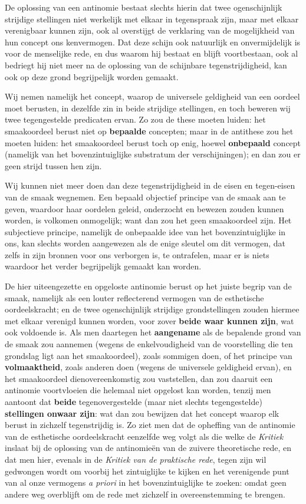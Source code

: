 De oplossing van een antinomie bestaat slechts hierin dat twee ogenschijnlijk strijdige stellingen niet werkelijk met elkaar in tegenspraak zijn, maar met elkaar verenigbaar kunnen zijn, ook al overstijgt de verklaring van de mogelijkheid van hun concept ons kenvermogen. Dat deze schijn ook natuurlijk en onvermijdelijk is voor de menselijke rede, en dus waarom hij bestaat en blijft voortbestaan, ook al bedriegt hij niet meer na de oplossing van de schijnbare tegenstrijdigheid, kan ook op deze grond begrijpelijk worden gemaakt.

Wij nemen namelijk het concept, waarop de universele geldigheid van een oordeel moet berusten, in dezelfde zin in beide strijdige stellingen, en toch beweren wij twee tegengestelde predicaten ervan. Zo zou de these moeten luiden: het smaakoordeel berust niet op \textbf{bepaalde} concepten; maar in de antithese zou het moeten luiden: het smaakoordeel berust toch op enig, hoewel \textbf{onbepaald} concept (namelijk van het bovenzintuiglijke substratum der verschijningen); en dan zou er geen strijd tussen hen zijn.

Wij kunnen niet meer doen dan deze tegenstrijdigheid in de eisen en tegen-eisen van de smaak wegnemen. Een bepaald objectief principe van de smaak aan te geven, waardoor haar oordelen geleid, onderzocht en bewezen zouden kunnen worden, is volkomen onmogelijk; want dan zou het geen smaakoordeel zijn. Het subjectieve principe, namelijk de onbepaalde idee van het bovenzintuiglijke in ons, kan slechts worden aangewezen als de enige sleutel om dit vermogen, dat zelfs in zijn bronnen voor ons verborgen is, te ontrafelen, maar er is niets waardoor het verder begrijpelijk gemaakt kan worden.

De hier uiteengezette en opgeloste antinomie berust op het juiste begrip van de smaak, namelijk als een louter reflecterend vermogen van de esthetische oordeelskracht; en de twee ogenschijnlijk strijdige grondstellingen zouden hiermee met elkaar verenigd kunnen worden, voor zover \textbf{beide waar kunnen zijn}, wat ook voldoende is. Als men daartegen het \textbf{aangename} als de bepalende grond van de smaak zou aannemen (wegens de enkelvoudigheid van de voorstelling die ten grondslag ligt aan het smaakoordeel), zoals sommigen doen, of het principe van \textbf{volmaaktheid}, zoals anderen doen (wegens de universele geldigheid ervan), en het smaakoordeel dienovereenkomstig zou vaststellen, dan zou daaruit een antinomie voortvloeien die helemaal niet opgelost kan worden, tenzij men aantoont dat \textbf{beide} tegenovergestelde (maar niet slechts tegengestelde) \textbf{stellingen onwaar zijn}: wat dan zou bewijzen dat het concept waarop elk berust in zichzelf tegenstrijdig is. Zo ziet men dat de opheffing van de antinomie van de esthetische oordeelskracht eenzelfde weg volgt als die welke de \textit{Kritiek} inslaat bij de oplossing van de antinomieën van de zuivere theoretische rede, en dat men hier, evenals in de \textit{Kritiek van de praktische rede}, tegen zijn wil gedwongen wordt om voorbij het zintuiglijke te kijken en het verenigende punt van al onze vermogens \textit{a priori} in het bovenzintuiglijke te zoeken: omdat geen andere weg overblijft om de rede met zichzelf in overeenstemming te brengen.

